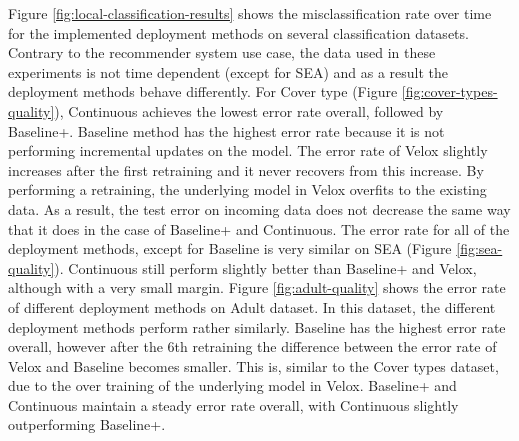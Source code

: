 \documentclass[10pt,conference,letterpaper]{IEEEtran}
\begin{document}
Figure \ref{fig:local-classification-results} shows the misclassification rate over time for the implemented deployment methods on several classification datasets.
Contrary to the recommender system use case, the data used in these experiments is not time dependent (except for SEA) and as a result the deployment methods behave differently.
For Cover type (Figure \ref{fig:cover-types-quality}), Continuous achieves the lowest error rate overall, followed by Baseline+.
Baseline method has the highest error rate because it is not performing incremental updates on the model.
The error rate of Velox slightly increases after the first retraining and it never recovers from this increase.
By performing a retraining, the underlying model in Velox overfits to the existing data.
As a result, the test error on incoming data does not decrease the same way that it does in the case of Baseline+ and Continuous.
The error rate for all of the deployment methods, except for Baseline is very similar on SEA (Figure \ref{fig:sea-quality}).
Continuous still perform slightly better than Baseline+ and Velox, although with a very small margin.
Figure \ref{fig:adult-quality} shows the error rate of different deployment methods on Adult dataset.
In this dataset, the different deployment methods perform rather similarly.
Baseline has the highest error rate overall, however after the 6th retraining the difference between the error rate of Velox and Baseline becomes smaller.
This is, similar to the Cover types dataset, due to the over training of the underlying model in Velox.
Baseline+ and Continuous maintain a steady error rate overall, with Continuous slightly outperforming Baseline+.
\end{document}
